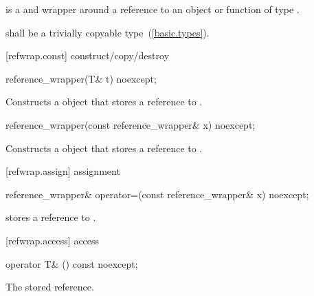 \pnum
{} is a  and  wrapper
around a reference to an object or function of type .

\pnum
{} shall be a trivially copyable type~(\ref{basic.types}).

[refwrap.const]{ construct/copy/destroy}

%
\begin{itemdecl}
reference_wrapper(T& t) noexcept;
\end{itemdecl}

\begin{itemdescr}
\pnum
\effects Constructs a  object that stores a
reference to .
\end{itemdescr}

%
\begin{itemdecl}
reference_wrapper(const reference_wrapper& x) noexcept;
\end{itemdecl}

\begin{itemdescr}
\pnum\effects Constructs a  object that
stores a reference to .
\end{itemdescr}

[refwrap.assign]{ assignment}

%
\begin{itemdecl}
reference_wrapper& operator=(const reference_wrapper& x) noexcept;
\end{itemdecl}

\begin{itemdescr}
\pnum\postcondition {} stores a reference to  .
\end{itemdescr}

[refwrap.access]{ access}

%
\begin{itemdecl}
operator T& () const noexcept;
\end{itemdecl}

\begin{itemdescr}
\pnum\returns The stored reference.
\end{itemdescr}

